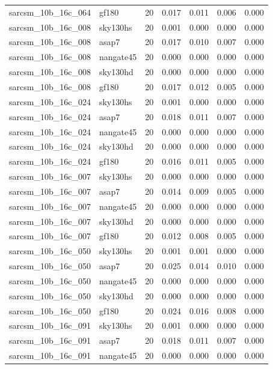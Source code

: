 \begin{tabular}{llrrrrr}
sarcsm\_10b\_16c\_064 & gf180 & 20 & 0.017 & 0.011 & 0.006 & 0.000 \\
sarcsm\_10b\_16c\_008 & sky130hs & 20 & 0.001 & 0.000 & 0.000 & 0.000 \\
sarcsm\_10b\_16c\_008 & asap7 & 20 & 0.017 & 0.010 & 0.007 & 0.000 \\
sarcsm\_10b\_16c\_008 & nangate45 & 20 & 0.000 & 0.000 & 0.000 & 0.000 \\
sarcsm\_10b\_16c\_008 & sky130hd & 20 & 0.000 & 0.000 & 0.000 & 0.000 \\
sarcsm\_10b\_16c\_008 & gf180 & 20 & 0.017 & 0.012 & 0.005 & 0.000 \\
sarcsm\_10b\_16c\_024 & sky130hs & 20 & 0.001 & 0.000 & 0.000 & 0.000 \\
sarcsm\_10b\_16c\_024 & asap7 & 20 & 0.018 & 0.011 & 0.007 & 0.000 \\
sarcsm\_10b\_16c\_024 & nangate45 & 20 & 0.000 & 0.000 & 0.000 & 0.000 \\
sarcsm\_10b\_16c\_024 & sky130hd & 20 & 0.000 & 0.000 & 0.000 & 0.000 \\
sarcsm\_10b\_16c\_024 & gf180 & 20 & 0.016 & 0.011 & 0.005 & 0.000 \\
sarcsm\_10b\_16c\_007 & sky130hs & 20 & 0.000 & 0.000 & 0.000 & 0.000 \\
sarcsm\_10b\_16c\_007 & asap7 & 20 & 0.014 & 0.009 & 0.005 & 0.000 \\
sarcsm\_10b\_16c\_007 & nangate45 & 20 & 0.000 & 0.000 & 0.000 & 0.000 \\
sarcsm\_10b\_16c\_007 & sky130hd & 20 & 0.000 & 0.000 & 0.000 & 0.000 \\
sarcsm\_10b\_16c\_007 & gf180 & 20 & 0.012 & 0.008 & 0.005 & 0.000 \\
sarcsm\_10b\_16c\_050 & sky130hs & 20 & 0.001 & 0.001 & 0.000 & 0.000 \\
sarcsm\_10b\_16c\_050 & asap7 & 20 & 0.025 & 0.014 & 0.010 & 0.000 \\
sarcsm\_10b\_16c\_050 & nangate45 & 20 & 0.000 & 0.000 & 0.000 & 0.000 \\
sarcsm\_10b\_16c\_050 & sky130hd & 20 & 0.000 & 0.000 & 0.000 & 0.000 \\
sarcsm\_10b\_16c\_050 & gf180 & 20 & 0.024 & 0.016 & 0.008 & 0.000 \\
sarcsm\_10b\_16c\_091 & sky130hs & 20 & 0.001 & 0.000 & 0.000 & 0.000 \\
sarcsm\_10b\_16c\_091 & asap7 & 20 & 0.018 & 0.011 & 0.007 & 0.000 \\
sarcsm\_10b\_16c\_091 & nangate45 & 20 & 0.000 & 0.000 & 0.000 & 0.000 \\

\end{tabular}
